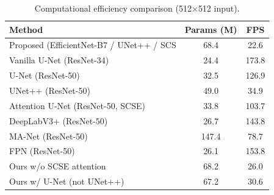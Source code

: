 \begin{table}[t]
\centering
\caption{Computational efficiency comparison (512$\times$512 input).}
\label{tab:efficiency}
\begin{tabular}{lcc}
\toprule
Method & Params (M) & FPS \\
\midrule
Proposed (EfficientNet-B7 / UNet++ / SCS & 68.4 & 22.6 \\
Vanilla U-Net (ResNet-34) & 24.4 & 173.8 \\
U-Net (ResNet-50) & 32.5 & 126.9 \\
UNet++ (ResNet-50) & 49.0 & 34.9 \\
Attention U-Net (ResNet-50, SCSE) & 33.8 & 103.7 \\
DeepLabV3+ (ResNet-50) & 26.7 & 143.8 \\
MA-Net (ResNet-50) & 147.4 & 78.7 \\
FPN (ResNet-50) & 26.1 & 153.8 \\
Ours w/o SCSE attention & 68.2 & 26.0 \\
Ours w/ U-Net (not UNet++) & 67.2 & 30.6 \\
\bottomrule
\end{tabular}
\end{table}